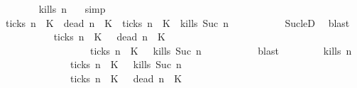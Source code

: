 \begin{isabellebody}
\ \ \ \ \ \ \isamarkupfalse%
\ {\isacartoucheopen}{\isacharquery}kills\ n\ {\isasymrho}{\isacartoucheclose}\ \isamarkupfalse%
\ simp\isanewline
\ \ \ \ \ \ \isamarkupfalse%
\ {\isacartoucheopen}{\isacharparenleft}{\isacharquery}ticks\ n\ {\isasymrho}\ K\ {\isasymand}\ {\isacharquery}dead\ n\ {\isasymrho}\ K\ {\isasymor}\ {\isacharparenleft}{\isasymnot}{\isacharquery}ticks\ n\ {\isasymrho}\ K\ {\isasymand}\ {\isacharquery}kills\ {\isacharparenleft}Suc\ n{\isacharparenright}\ {\isasymrho}{\isacharparenright}{\isacartoucheclose}\isanewline
\ \ \ \ \ \ \ \ \isamarkupfalse%
\ Suc{\isacharunderscore}leD\ \isamarkupfalse%
\ blast\isanewline
\ \ \ \ \ \ \isamarkupfalse%
\ {\isacartoucheopen}{\isasymrho}\ {\isasymin}\ {\isacharparenleft}{\isacharbraceleft}{\isasymrho}{\isachardot}\ {\isacharquery}ticks\ n\ {\isasymrho}\ K\ {\isasyminter}\ {\isacharbraceleft}{\isasymrho}{\isachardot}\ {\isacharquery}dead\ n\ {\isasymrho}\ K\isanewline
\ \ \ \ \ \ \ \ \ \ \ \ \ \ \ {\isasymunion}\ {\isacharparenleft}{\isacharbraceleft}{\isasymrho}{\isachardot}\ {\isasymnot}\ {\isacharquery}ticks\ n\ {\isasymrho}\ K\ {\isasyminter}\ {\isacharbraceleft}{\isasymrho}{\isachardot}\ {\isacharquery}kills\ {\isacharparenleft}Suc\ n{\isacharparenright}\ {\isasymrho}{\isacharbraceright}{\isacharparenright}{\isacartoucheclose}\isanewline
\ \ \ \ \ \ \ \ \isamarkupfalse%
\ blast\isanewline
\ \ \ \ \isacommand{{\isacharbraceright}}\isamarkupfalse%
\ \isamarkupfalse%
\ {\isacartoucheopen}{\isacharbraceleft}{\isasymrho}{\isachardot}\ {\isacharquery}kills\ n\ {\isasymrho}{\isacharbraceright}\isanewline
\ \ \ \ \ \ \ \ \ \ \ {\isasymsubseteq}\ {\isacharbraceleft}{\isasymrho}{\isachardot}\ {\isasymnot}\ {\isacharquery}ticks\ n\ {\isasymrho}\ K\ {\isasyminter}\ {\isacharbraceleft}{\isasymrho}{\isachardot}\ {\isacharquery}kills\ {\isacharparenleft}Suc\ n{\isacharparenright}\ {\isasymrho}{\isacharbraceright}\ \isanewline
\ \ \ \ \ \ \ \ \ \ \ \ {\isasymunion}\ {\isacharbraceleft}{\isasymrho}{\isachardot}\ {\isacharquery}ticks\ n\ {\isasymrho}\ K\ {\isasyminter}\ {\isacharbraceleft}{\isasymrho}{\isachardot}\ {\isacharquery}dead\ n\ {\isasymrho}\ K\ \isamarkupfalse%

\end{isabellebody}
